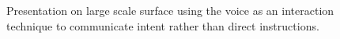 \documentclass[journal]{vgtc}                %
\begin{document}








\begin{figure}[t]
	\centering
	\caption{Presentation on large scale surface using the voice as an interaction technique to communicate intent rather than direct instructions.}
	\label{img:dome_presentation}
\end{figure}
\end{document}
